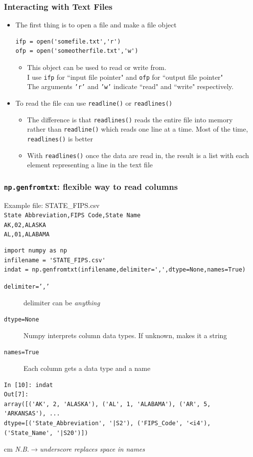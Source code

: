\documentclass{beamer}
\begin{document}
\begin{frame}[fragile]
\frametitle{Interacting with Text Files}
\begin{itemize}
\item The first thing is to open a file and make a file object
\begin{lstlisting}
ifp = open('somefile.txt','r')
ofp = open('someotherfile.txt','w')
\end{lstlisting}
\begin{itemize}
\item This object can be used to read or write from. \\I use \texttt{ifp} for ``input file pointer" and \texttt{ofp} for ``output file pointer" \\
The arguments \texttt{'r'} and \texttt{'w'} indicate ``read" and ``write" respectively.
\end{itemize}
\item To read the file can use \texttt{readline()} or \texttt{readlines()}\\
\begin{itemize}
\item The difference is that  \texttt{readlines()} reads the entire file into memory rather than  \texttt{readline()}  which reads one line at a time. Most of the time,  \texttt{readlines()}  is better
\item With \texttt{readlines()}  once the data are read in, the result is a list with each element representing a line in the text file
\end{itemize}
\end{itemize}
\end{frame}


\begin{frame}[fragile]
\frametitle{\texttt{np.genfromtxt}: flexible way to read columns}
Example file: STATE\_FIPS.csv \\
\texttt{State Abbreviation,FIPS Code,State Name} \\
\texttt{AK,02,ALASKA} \\
\texttt{AL,01,ALABAMA}  \\
\pause
\begin{lstlisting}
import numpy as np
infilename = 'STATE_FIPS.csv'
indat = np.genfromtxt(infilename,delimiter=',',dtype=None,names=True)
\end{lstlisting}
\pause
\begin{description}
\item[\texttt{delimiter=','}] delimiter can be \emph{anything}
\item[\texttt{dtype=None}] Numpy interprets column data types. If unknown, makes it a string
\item[\texttt{names=True}] Each column gets a data type and a name
\end{description}
\pause
\begin{lstlisting}
In [10]: indat
Out[7]: 
array([('AK', 2, 'ALASKA'), ('AL', 1, 'ALABAMA'), ('AR', 5, 'ARKANSAS'), ... 
dtype=[('State_Abbreviation', '|S2'), ('FIPS_Code', '<i4'), ('State_Name', '|S20')])
\end{lstlisting}
\pause
{} cm \emph{N.B.$\rightarrow$underscore replaces space in names}
\end{frame}
\end{document}
